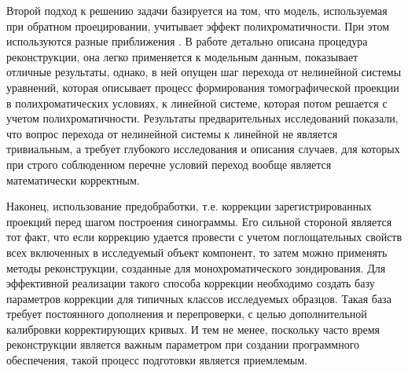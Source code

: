 Второй подход к решению задачи базируется на том, что модель, используемая при обратном проецировании, учитывает эффект полихроматичности.
При этом используются разные приближения \cite{stenner2010dynamic, van2011iterative}.
В работе \cite{brabant2012novel} детально описана процедура реконструкции, она легко применяется к модельным данным, показывает отличные результаты, однако, в ней опущен шаг перехода от нелинейной системы уравнений, которая описывает процесс формирования томографической проекции в полихроматических условиях, к линейной системе, которая потом решается с учетом полихроматичности.
Результаты предварительных исследований показали, что вопрос перехода от нелинейной системы к линейной не является тривиальным, а требует глубокого исследования и описания случаев, для которых при строго соблюденном перечне условий переход вообще является математически корректным.

Наконец, использование предобработки, т.е. коррекции зарегистрированных проекций перед шагом построения синограммы.
Его сильной стороной является тот факт, что если коррекцию удается провести с учетом поглощательных свойств всех включенных в исследуемый объект компонент, то затем можно применять методы реконструкции, созданные для монохроматического зондирования.
Для эффективной реализации такого способа коррекции необходимо создать базу параметров коррекции для типичных классов исследуемых образцов.
Такая база требует постоянного дополнения и перепроверки, с целью дополнительной калибровки корректирующих кривых.
И тем не менее, поскольку часто время реконструкции является важным параметром при создании программного обеспечения, такой процесс подготовки является приемлемым.